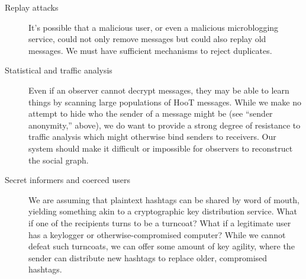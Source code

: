 \begin{description}
\item[Replay attacks] It's possible that a malicious user, or even a malicious microblogging service, could not only remove messages but could also replay old messages. We must have sufficient mechanisms to reject duplicates.

\item[Statistical and traffic analysis] Even if an observer cannot decrypt messages, they may be able to learn things by scanning large populations of HooT messages. While we make no attempt to hide who the sender of a message might be (see ``sender anonymity,'' above), we do want to provide a strong degree of resistance to traffic analysis which might otherwise bind senders to receivers. Our system should make it difficult or impossible for observers to reconstruct the social graph.

\item[Secret informers and coerced users] We are assuming that plaintext hashtags can be shared by word of mouth, yielding something akin to a cryptographic key distribution service. What if one of the recipients turns to be a turncoat? What if a legitimate user has a keylogger or otherwise-compromised computer? While we cannot defeat such turncoats, we can offer some amount of key agility, where the sender can distribute new hashtags to replace older, compromised hashtags.

\end{description}
% 
% 
%  
% 
